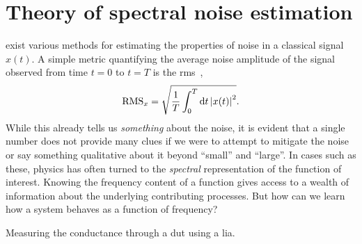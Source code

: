\chapter{Theory of spectral noise estimation}\label{ch:speck:theory}
 exist various methods for estimating the properties of noise in a classical signal $x(t)$.
A simple metric quantifying the average noise amplitude of the signal observed from time $t=0$ to $t=T$ is the \gls{rms}~\cite{RMSMathworld},
\begin{align}\label{eq:speck:rms:timedomain}
    \operatorname{RMS}_x = \sqrt{\frac{1}{T}\int_{0}^{T}\dd{t}\abs{x(t)}^2}.
\end{align}
While this already tells us \emph{something} about the noise, it is evident that a single number does not provide many clues if we were to attempt to mitigate the noise or say something qualitative about it beyond \enquote{small} and \enquote{large}.
In cases such as these, physics has often turned to the \emph{spectral} representation of the function of interest.
Knowing the frequency content of a function gives access to a wealth of information about the underlying contributing processes.
But how can we learn how a system behaves as a function of frequency?

\begin{marginfigure}[*-6]
    \centering
    
    \caption[]{Measuring the conductance through a \gls{dut} using a \gls{lia}.}
    \label{fig:speck:theory:lockin_dut}
\end{marginfigure}

